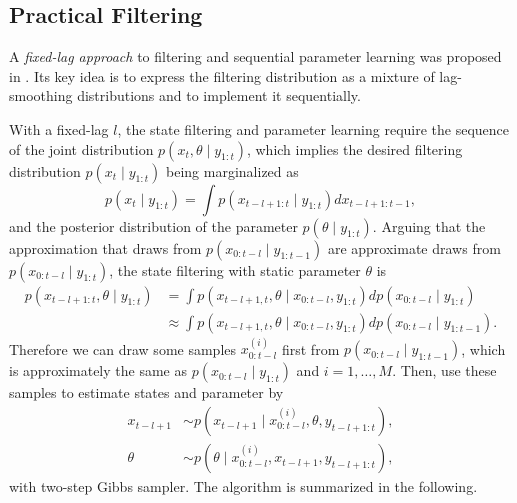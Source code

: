 \subsection{Practical Filtering}

A \textit{fixed-lag approach} to filtering and sequential parameter learning was proposed in \citep{polson2008practical}. Its key idea is to express the filtering distribution as a mixture of lag-smoothing distributions and to implement it sequentially. 

With a fixed-lag $l$, the state filtering and parameter learning require the sequence of the joint distribution $p(x_t,\theta\mid y_{1:t})$, which implies the desired filtering distribution $p(x_t\mid y_{1:t})$ being marginalized as 
\begin{equation*}
p(x_t\mid y_{1:t}) = \int p(x_{t-l+1:t}\mid y_{1:t}) dx_{t-l+1:t-1},
\end{equation*}
and the posterior distribution of the parameter $p(\theta\mid y_{1:t})$. Arguing that the approximation that draws from $p(x_{0:t-l}\mid y_{1:t-1})$ are approximate draws from $p(x_{0:t-l}\mid y_{1:t})$, the state filtering with static parameter $\theta$ is 
\begin{align*}
p(x_{t-l+1:t},\theta\mid y_{1:t}) &=\int p(x_{t-l+1,t},\theta \mid x_{0:t-l},y_{1:t}) dp(x_{0:t-l}\mid y_{1:t}) \\
&\approx \int p(x_{t-l+1,t},\theta \mid x_{0:t-l},y_{1:t}) dp(x_{0:t-l}\mid y_{1:t-1}).
\end{align*}
Therefore we can draw some samples $x_{0:t-l}^{(i)}$ first from $p(x_{0:t-l}\mid y_{1:t-1})$, which is approximately the same as $p(x_{0:t-l}\mid y_{1:t})$ and $i=1,\ldots,M$. Then, use these samples to estimate states and parameter by 
\begin{align*}
x_{t-l+1} &\sim p\left(x_{t-l+1}\mid x_{0:t-l}^{(i)},\theta,y_{t-l+1:t}\right),\\
\theta &\sim p\left(\theta \mid x_{0:t-l}^{(i)},x_{t-l+1},y_{t-l+1:t}\right),
\end{align*}
with two-step Gibbs sampler. The algorithm is summarized in the following. 
